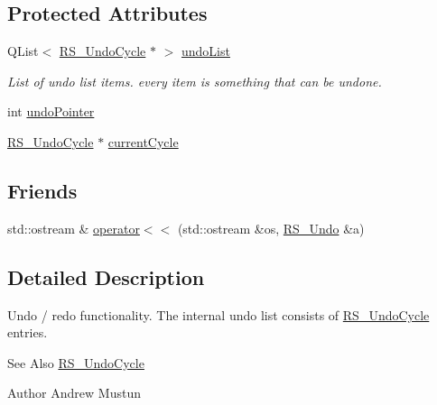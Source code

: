 \subsection*{Protected Attributes}
\begin{DoxyCompactItemize}
\item 
\hypertarget{classRS__Undo_afef4a3f7db613fe109b024d323aa0ea1}{Q\-List$<$ \hyperlink{classRS__UndoCycle}{R\-S\-\_\-\-Undo\-Cycle} $\ast$ $>$ \hyperlink{classRS__Undo_afef4a3f7db613fe109b024d323aa0ea1}{undo\-List}}\label{classRS__Undo_afef4a3f7db613fe109b024d323aa0ea1}

\begin{DoxyCompactList}\small\item\em List of undo list items. every item is something that can be undone. \end{DoxyCompactList}\item 
int \hyperlink{classRS__Undo_abfa9454560fba30af5c06a506b07fc89}{undo\-Pointer}
\item 
\hyperlink{classRS__UndoCycle}{R\-S\-\_\-\-Undo\-Cycle} $\ast$ \hyperlink{classRS__Undo_a0e92a818317a5de8c3cad84e6c1bebb1}{current\-Cycle}
\end{DoxyCompactItemize}
\subsection*{Friends}
\begin{DoxyCompactItemize}
\item 
std\-::ostream \& \hyperlink{classRS__Undo_a2d1eefd8e568642ef7fb6cfc48c35ddb}{operator$<$$<$} (std\-::ostream \&os, \hyperlink{classRS__Undo}{R\-S\-\_\-\-Undo} \&a)
\end{DoxyCompactItemize}


\subsection{Detailed Description}
Undo / redo functionality. The internal undo list consists of \hyperlink{classRS__UndoCycle}{R\-S\-\_\-\-Undo\-Cycle} entries.

\begin{DoxySeeAlso}{See Also}
\hyperlink{classRS__UndoCycle}{R\-S\-\_\-\-Undo\-Cycle} 
\end{DoxySeeAlso}
\begin{DoxyAuthor}{Author}
Andrew Mustun 
\end{DoxyAuthor}


